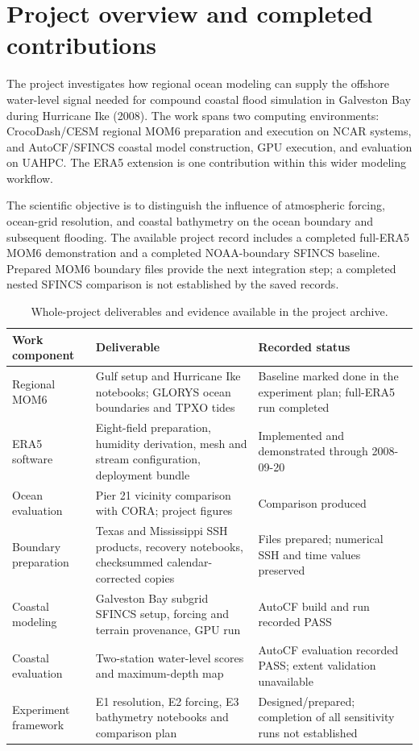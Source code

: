 \documentclass[11pt]{article}
\begin{document}
\tableofcontents
\newpage

\section{Project overview and completed contributions}

The project investigates how regional ocean modeling can supply the offshore water-level signal needed for compound coastal flood simulation in Galveston Bay during Hurricane Ike (2008). The work spans two computing environments: CrocoDash/CESM regional MOM6 preparation and execution on NCAR systems, and AutoCF/SFINCS coastal model construction, GPU execution, and evaluation on UAHPC. The ERA5 extension is one contribution within this wider modeling workflow.

The scientific objective is to distinguish the influence of atmospheric forcing, ocean-grid resolution, and coastal bathymetry on the ocean boundary and subsequent flooding. The available project record includes a completed full-ERA5 MOM6 demonstration and a completed NOAA-boundary SFINCS baseline. Prepared MOM6 boundary files provide the next integration step; a completed nested SFINCS comparison is not established by the saved records.

\begin{table}[htbp]
\centering
\caption{Whole-project deliverables and evidence available in the project archive.}
\begin{tabularx}{\textwidth}{@{}L{0.25\textwidth}Y L{0.24\textwidth}@{}}
\toprule
\textbf{Work component} & \textbf{Deliverable} & \textbf{Recorded status} \\
\midrule
Regional MOM6 & Gulf setup and Hurricane Ike notebooks; GLORYS ocean boundaries and TPXO tides & Baseline marked done in the experiment plan; full-ERA5 run completed \\
ERA5 software & Eight-field preparation, humidity derivation, mesh and stream configuration, deployment bundle & Implemented and demonstrated through 2008-09-20 \\
Ocean evaluation & Pier 21 vicinity comparison with CORA; project figures & Comparison produced \\
Boundary preparation & Texas and Mississippi SSH products, recovery notebooks, checksummed calendar-corrected copies & Files prepared; numerical SSH and time values preserved \\
Coastal modeling & Galveston Bay subgrid SFINCS setup, forcing and terrain provenance, GPU run & AutoCF build and run recorded PASS \\
Coastal evaluation & Two-station water-level scores and maximum-depth map & AutoCF evaluation recorded PASS; extent validation unavailable \\
Experiment framework & E1 resolution, E2 forcing, E3 bathymetry notebooks and comparison plan & Designed/prepared; completion of all sensitivity runs not established \\
\bottomrule
\end{tabularx}
\end{table}
\end{document}
